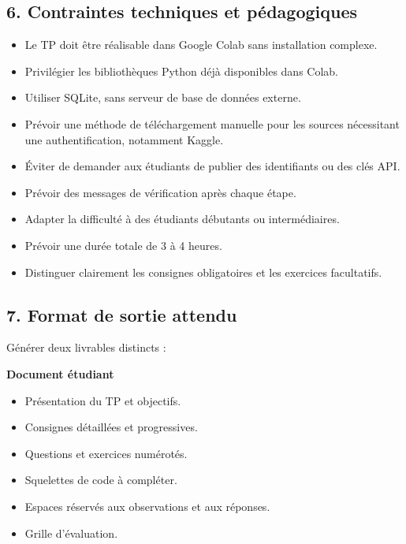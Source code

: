 \documentclass[
]{article}
\providecommand{\tightlist}{%
  \setlength{\itemsep}{0pt}\setlength{\parskip}{0pt}}
\begin{document}
\subsection{6. Contraintes techniques et
pédagogiques}\label{contraintes-techniques-et-puxe9dagogiques}

\begin{itemize}
\tightlist
\item
  Le TP doit être réalisable dans Google Colab sans installation
  complexe.
\item
  Privilégier les bibliothèques Python déjà disponibles dans Colab.
\item
  Utiliser SQLite, sans serveur de base de données externe.
\item
  Prévoir une méthode de téléchargement manuelle pour les sources
  nécessitant une authentification, notamment Kaggle.
\item
  Éviter de demander aux étudiants de publier des identifiants ou des
  clés API.
\item
  Prévoir des messages de vérification après chaque étape.
\item
  Adapter la difficulté à des étudiants débutants ou intermédiaires.
\item
  Prévoir une durée totale de 3 à 4 heures.
\item
  Distinguer clairement les consignes obligatoires et les exercices
  facultatifs.
\end{itemize}

\subsection{7. Format de sortie attendu}\label{format-de-sortie-attendu}

Générer deux livrables distincts :

\textbf{Document étudiant}

\begin{itemize}
\tightlist
\item
  Présentation du TP et objectifs.
\item
  Consignes détaillées et progressives.
\item
  Questions et exercices numérotés.
\item
  Squelettes de code à compléter.
\item
  Espaces réservés aux observations et aux réponses.
\item
  Grille d'évaluation.
\end{itemize}
\end{document}
